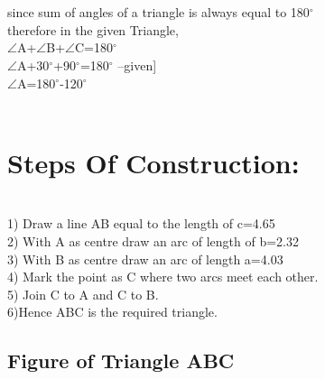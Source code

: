 \documentclass[a4paper,12pt]{article}
\begin{document}
\\

\\

since sum of angles of a triangle is always equal to 180$^{\circ}$\\

therefore in the given Triangle,\\

$\angle$A+$\angle$B+$\angle$C=180$^{\circ}$\\

$\angle$A+30$^{\circ}$+90$^{\circ}$=180$^{\circ}$ \hspace{3cm}{[\angle$B=30$^{\circ}$ and $\angle$C=90$^{\circ}$}--given]\\

$\angle$A=180$^{\circ}$-120$^{\circ}$\\

\\


\section{Steps Of Construction:}\\

1) Draw a line AB equal to the length of c=4.65\\

2) With A as centre draw an arc of length of b=2.32\\

3) With B as centre draw an arc of length a=4.03\\

4) Mark the point as C where two arcs meet each other.\\

5) Join C to A and C to B.\\

6)Hence ABC is the required triangle.\\

\subsection{Figure of Triangle ABC}

 \\
 


\newpage
\begin{center}
\end{center}
\end{document}
